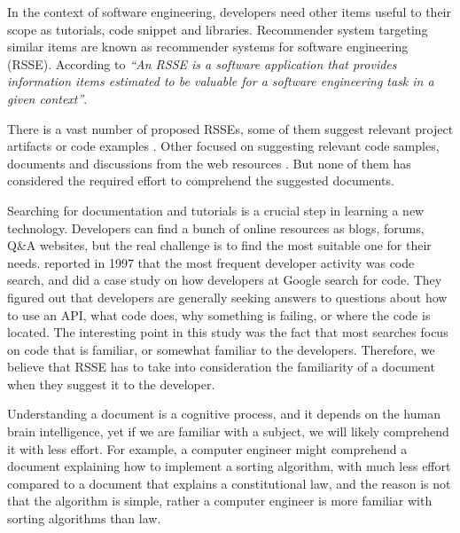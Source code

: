 \documentclass[12pt,mscthesis]{usiinfthesis}
\begin{document}
	  In the context of software engineering, developers need other items useful to their scope as tutorials, code snippet and libraries. Recommender system targeting similar items are known as recommender systems for software engineering (RSSE). According to \citet{RecommendationSystemsforSoftwareEngineering} 
	\emph{``An RSSE is a software application that provides information items estimated to be valuable for a software engineering task in a given context''}.
	

	There is a vast number of proposed RSSEs, some of them suggest relevant project artifacts or code examples \cite{Holmes:2005:USC:1062455.1062491} \cite{Cubranic:2003:HRP:776816.776866} \cite{Zimmermann:2004:MVH:998675.999460}. Other focused on suggesting relevant code samples, documents and discussions from the web resources \cite{Rahman:2015:RRS:2886444.2886471} \cite{Sawadsky:2011:FTC:1984708.1984722} \cite{Stylos:2006:MWT:1174509.1174678} \cite{10.1109/VLHCC.2012.6344497}. But none of them has considered the required effort to comprehend the suggested documents.


	Searching for documentation and tutorials is a crucial step in learning a new technology. Developers can find a bunch of online resources as blogs, forums, Q\&A websites, but the real challenge is to find the most suitable one for their needs. \citet{Singer-1997} reported in 1997 that the most frequent developer activity was code search, and \citet{Sadowski:2015} did a case study on how developers at Google search for code. They figured out that developers are generally seeking answers to questions about how to use an API, what code does, why something is failing, or where the code is located. The interesting point in this study was the fact that most searches focus on code that is familiar, or somewhat familiar to the developers.
	Therefore, we believe that RSSE has to take into consideration the familiarity of a document when they suggest it to the developer. 

	
	Understanding a document is a cognitive process, and it depends on the human brain intelligence, yet if we are familiar with a subject, we will likely comprehend it with less effort. For example, a computer engineer might comprehend a document explaining how to implement a sorting algorithm, with much less effort compared to a document that explains a constitutional law, and the reason is not that the algorithm is simple, rather a computer engineer is more familiar with sorting algorithms than law.
	
\end{document}
